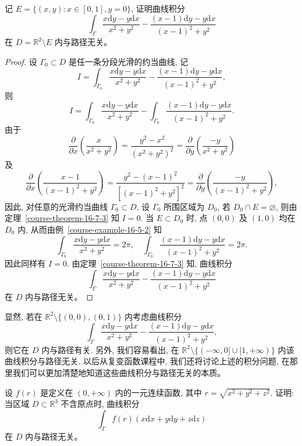 \documentclass[12pt,fontset=fandol]{ctexart}
\begin{document}
\begin{example}\label{course-example-16-7-1}\quad 记 $E=\{(x,y):x\in[0,1],y=0\}$, 证明曲线积分
\[
  \int_\Gamma\frac{x\mathrm dy-y\mathrm dx}{x^2+y^2}
  -\frac{(x-1)\mathrm dy-y\mathrm dx}{(x-1)^2+y^2}
\]
在 $D=\mathbb R^2\setminus E$ 内与路径无关。

\end{example}
\begin{proof}\quad 设 $\Gamma_0\subset D$ 是任一条分段光滑的约当曲线, 记
\[
  I=\int_{\Gamma_0}\frac{x\mathrm dy-y\mathrm dx}{x^2+y^2}
  -\frac{(x-1)\mathrm dy-y\mathrm dx}{(x-1)^2+y^2},
\]
则
\[
  I=\int_{\Gamma_0}\frac{x\mathrm dy-y\mathrm dx}{x^2+y^2}
  -\int_{\Gamma_0}\frac{(x-1)\mathrm dy-y\mathrm dx}{(x-1)^2+y^2}.
\]
由于
\[
  \frac{\partial}{\partial x}\left(\frac{x}{x^2+y^2}\right)
  =\frac{y^2-x^2}{(x^2+y^2)^2}
  =\frac{\partial}{\partial y}\left(\frac{-y}{x^2+y^2}\right)
\]
及
\[
  \frac{\partial}{\partial x}\left(\frac{x-1}{(x-1)^2+y^2}\right)
  =\frac{y^2-(x-1)^2}{[(x-1)^2+y^2]^2}
  =\frac{\partial}{\partial y}\left(\frac{-y}{(x-1)^2+y^2}\right),
\]
因此, 对任意的光滑约当曲线 $\Gamma_0\subset D$, 设 $\Gamma_0$ 所围区域为 $D_0$, 若 $D_0\cap E=\varnothing$, 则由定理~\ref{course-theorem-16-7-3}  知 $I=0$. 当 $E\subset D_0$ 时, 点 $(0,0)$ 及 $(1,0)$ 均在 $D_0$ 内, 从而由例~\ref{course-example-16-5-2}  知
\[
  \int_{\Gamma_0}\frac{x\mathrm dy-y\mathrm dx}{x^2+y^2}=2\pi,
  \quad
  \int_{\Gamma_0}\frac{(x-1)\mathrm dy-y\mathrm dx}{(x-1)^2+y^2}=2\pi.
\]
因此同样有 $I=0$. 由定理~\ref{course-theorem-16-7-3}  知, 曲线积分
\[
  \int_\Gamma\frac{x\mathrm dy-y\mathrm dx}{x^2+y^2}
  -\frac{(x-1)\mathrm dy-y\mathrm dx}{(x-1)^2+y^2}
\]
在 $D$ 内与路径无关。

\end{proof}
\begin{remark}\quad 显然, 若在 $\mathbb R^2\setminus\{(0,0),(0,1)\}$ 内考虑曲线积分
\[
  \int_\Gamma\frac{x\mathrm dy-y\mathrm dx}{x^2+y^2}
  -\frac{(x-1)\mathrm dy-y\mathrm dx}{(x-1)^2+y^2},
\]
则它在 $D$ 内与路径有关. 另外, 我们容易看出, 在 $\mathbb R^2\setminus\{(-\infty,0]\cup[1,+\infty)\}$ 内该曲线积分与路径无关. 以后从复变函数课程中, 我们还将讨论上述的积分问题, 在那里我们可以更加清楚地知道这些曲线积分与路径无关的本质。

\end{remark}
\begin{example}\label{course-example-16-7-2}\quad 设 $f(r)$ 是定义在 $(0,+\infty)$ 内的一元连续函数, 其中 $r=\sqrt{x^2+y^2+z^2}$. 证明: 当区域 $D\subset\mathbb R^3$ 不含原点时, 曲线积分
\[
  \int_\Gamma f(r)(x\mathrm dx+y\mathrm dy+z\mathrm dz)
\]
在 $D$ 内与路径无关。

\end{example}
\end{document}
